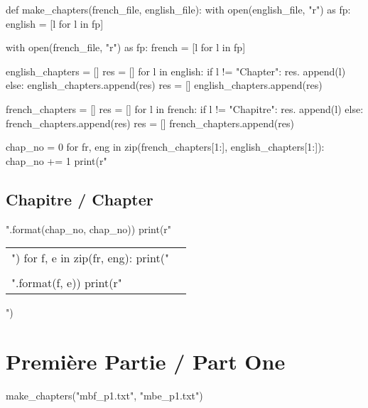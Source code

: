 \documentclass[a5paper]{book}
\begin{document}
\mainmatter

\begin{pycode}
def make_chapters(french_file, english_file):
    with open(english_file, "r") as fp:
        english = [l for l in fp]

    with open(french_file, "r") as fp:
        french = [l for l in fp]

    english_chapters = []
    res = []
    for l in english:
        if l != "Chapter\n":
            res. append(l)
        else:
            english_chapters.append(res)
            res = []
    english_chapters.append(res)


    french_chapters = []
    res = []
    for l in french:
        if l != "Chapitre\n":
            res. append(l)
        else:
            french_chapters.append(res)
            res = []
    french_chapters.append(res)

    chap_no = 0
    for fr, eng in zip(french_chapters[1:], english_chapters[1:]):
        chap_no += 1
        print(r"\chapter{{Chapitre {} / Chapter {}}}".format(chap_no, chap_no))
        print(r"\begin{longtable}{PP}")
        for f, e in zip(fr, eng):
            print("{} & {} \\\\".format(f, e))
        print(r"\end{longtable}")
\end{pycode}
    
\part*{Première Partie / Part One}
\begin{pycode}
make_chapters("mbf_p1.txt", "mbe_p1.txt")
\end{pycode}
\end{document}
